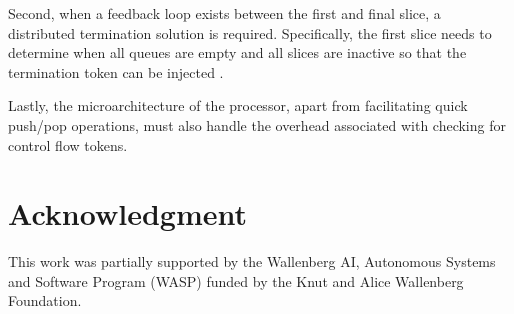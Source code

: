 \documentclass{acaces}
\begin{document}
Second, when a feedback loop exists between the first and final slice, a distributed termination solution is required.
Specifically, the first slice needs to determine when all queues are empty and all slices are inactive so that the termination token can be injected \cite{Dijkstra1983}.

Lastly, the microarchitecture of the processor, apart from facilitating quick push/pop operations, must also handle the overhead associated with checking for control flow tokens.

\section{Acknowledgment}

This work was partially supported by the Wallenberg AI, Autonomous Systems and Software Program (WASP)
funded by the Knut and Alice Wallenberg Foundation.


\end{document}
